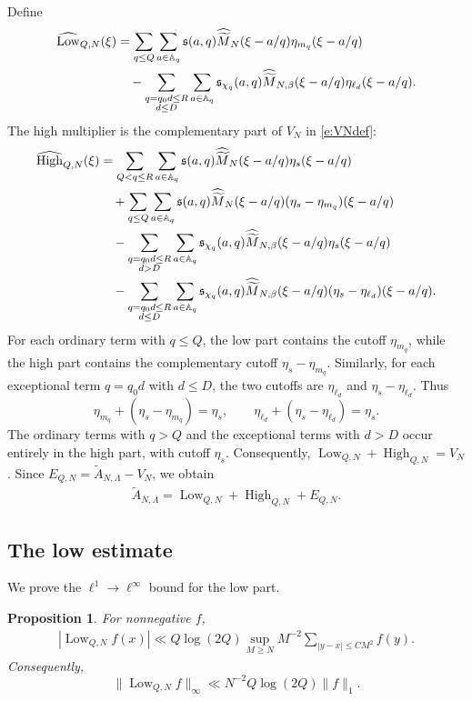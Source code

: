 \documentclass[12pt,reqno]{amsart}
\numberwithin{equation}{section}
\newtheorem{proposition}[equation]{Proposition}
\theoremstyle{definition}
\theoremstyle{remark}
\begin{document}
Define
\begin{align}\label{e:lowpart1}
 \widehat{\operatorname{Low}}_{Q,N}(\xi)
 &=\sum_{q\leq Q}\sum_{a\in\mathbb A_q}
 \mathfrak s(a,q)\widehat{\widetilde M}_N(\xi-a/q)
 \eta_{m_q}(\xi-a/q)\notag\\
 &\quad-\sum_{\substack{q=q_0d\leq R\\d\leq D}}
 \sum_{a\in\mathbb A_q}
 \mathfrak s_{\chi_q}(a,q)
 \widehat{\widetilde M}_{N,\beta}(\xi-a/q)
 \eta_{\ell_d}(\xi-a/q).
\end{align}
The high multiplier is the complementary part of \(V_N\) in \eqref{e:VNdef}:
\begin{align}\label{e:highpart}
 \widehat{\operatorname{High}}_{Q,N}(\xi)
 &=\sum_{Q<q\leq R}\sum_{a\in\mathbb A_q}
 \mathfrak s(a,q)\widehat{\widetilde M}_N(\xi-a/q)
 \eta_s(\xi-a/q)\notag\\
 &\quad+\sum_{q\leq Q}\sum_{a\in\mathbb A_q}
 \mathfrak s(a,q)\widehat{\widetilde M}_N(\xi-a/q)
 (\eta_s-\eta_{m_q})(\xi-a/q)\notag\\
 &\quad-\sum_{\substack{q=q_0d\leq R\\d>D}}
 \sum_{a\in\mathbb A_q}
 \mathfrak s_{\chi_q}(a,q)
 \widehat{\widetilde M}_{N,\beta}(\xi-a/q)
 \eta_s(\xi-a/q)\notag\\
 &\quad-\sum_{\substack{q=q_0d\leq R\\d\leq D}}
 \sum_{a\in\mathbb A_q}
 \mathfrak s_{\chi_q}(a,q)
 \widehat{\widetilde M}_{N,\beta}(\xi-a/q)
 (\eta_s-\eta_{\ell_d})(\xi-a/q).
\end{align}
For each ordinary term with \(q\leq Q\), the low part contains the
cutoff \(\eta_{m_q}\), while the high part contains the complementary
cutoff \(\eta_s-\eta_{m_q}\).  Similarly, for each exceptional term
\(q=q_0d\) with \(d\leq D\), the two cutoffs are
\(\eta_{\ell_d}\) and \(\eta_s-\eta_{\ell_d}\).  Thus
\[
 \eta_{m_q}+(\eta_s-\eta_{m_q})=\eta_s,
 \qquad
 \eta_{\ell_d}+(\eta_s-\eta_{\ell_d})=\eta_s.
\]
The ordinary terms with \(q>Q\) and the exceptional terms with \(d>D\)
occur entirely in the high part, with cutoff \(\eta_s\).  Consequently,
\(\operatorname{Low}_{Q,N}+\operatorname{High}_{Q,N}=V_N\).
Since \(E_{Q,N}=\widetilde A_{N,\Lambda}-V_N\), we obtain
\begin{align}\label{e:decompdecomp}
 \widetilde A_{N,\Lambda}
 =\operatorname{Low}_{Q,N}
 +\operatorname{High}_{Q,N}+E_{Q,N}.
\end{align}

\subsection{The low estimate}
We prove the \(\ell^1\to\ell^\infty\) bound for the low part.
\begin{proposition}\label{p:lowcontribution}
For nonnegative \(f\),
\begin{align}\label{e:lowlocal}
 |\operatorname{Low}_{Q,N}f(x)|
 \ll Q\log(2Q)
 \sup_{M\geq N}M^{-2}
 \sum_{|y-x|\leq CM^2}f(y).
\end{align}
Consequently,
\[
 \|\operatorname{Low}_{Q,N}f\|_\infty
 \ll N^{-2}Q\log(2Q)\|f\|_1.
\]
\end{proposition}
\end{document}
